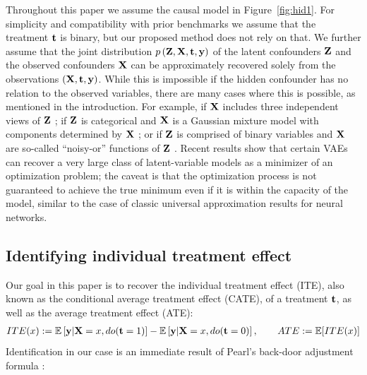 Throughout this paper we assume the causal model in Figure~\ref{fig:hid1}. For simplicity and compatibility with prior benchmarks we assume that the treatment $\mathbf{t}$ is binary, but our proposed method does not rely on that. We further assume that the joint distribution $p\left(\mathbf{Z},\mathbf{X},\mathbf{t},\mathbf{y}\right)$ of the latent confounders $\mathbf{Z}$ and the observed confounders $\mathbf{X}$ can be approximately recovered solely from the observations $\left(\mathbf{X},\mathbf{t},\mathbf{y}\right)$. While this is impossible if the hidden confounder has no relation to the observed variables, there are many cases where this is possible, as mentioned in the introduction.
For example, if $\mathbf{X}$ includes three independent views of $\mathbf{Z}$ \citep{anandkumar2012method,hsu2012spectral,goodman1974exploratory,allman2009identifiability}; if $\mathbf{Z}$ is categorical and $\mathbf{X}$ is a Gaussian mixture model with components determined by $\mathbf{X}$ \citep{anandkumar2014tensor};  or if $\mathbf{Z}$ is comprised of binary variables and $\mathbf{X}$ are so-called ``noisy-or'' functions of $\mathbf{Z}$ \citep{jernite2013discovering,tengyu_noisyor16}. Recent results show that certain VAEs can recover a very large class of latent-variable models \citep{tran2015variational} as a minimizer of an optimization problem; the caveat is that the optimization process is not guaranteed to achieve the true minimum even if it is within the capacity of the model, similar to the case of classic universal approximation results for neural networks.

\subsection{Identifying individual treatment effect}
Our goal in this paper is to recover the individual treatment effect (ITE), also known as the conditional average treatment effect (CATE), of a treatment $\mathbf{t}$, as well as the average treatment effect (ATE):
\begin{align*}%
ITE(x) := \E\left[\*y |\*X=x, do(\*t=1)\right] - \E\left[\*y |\*X=x, do(\*t=0)\right], 
\quad \quad ATE := \mathbb{E}[ITE(x)] 
\end{align*}
Identification in our case is an immediate result of Pearl's back-door adjustment formula \citep{pearl2009causality}:

